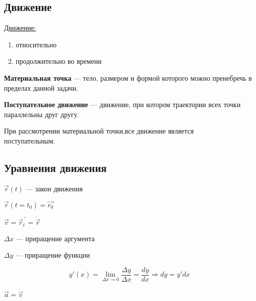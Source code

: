 \documentclass{article}
\begin{document}
\subsection{Движение}

{\Large \underline{Движение:}}
\begin{enumerate}
	\item относительно
	\item продолжительно во времени
\end{enumerate}

\textbf{Материальная точка} --- тело, размером и формой которого можно пренебречь в пределах данной задачи.

\textbf{Поступательное движение} --- движение, при котором траектории всех точки параллельны друг другу.

При рассмотрении материальной точки,все движение является \\
поступательным.

\subsection{Уравнения движения}

$\vec{r}(t)$ --- закон движения

$\vec{r}(t = t_0) = \vec{r_0}$

$\vec{v} = \vec{r}_t^{\ '} = \dot{\vec{r}}$

$\Delta x$ --- приращение аргумента

$\Delta y$ --- приращение функции

\[y'(x) = \lim_{\Delta x \to 0} \frac{\Delta y}{\Delta x} = \frac{dy}{dx} \Rightarrow dy = y'dx\]

$\vec{a} = \dot{\vec{v}}$
\end{document}
